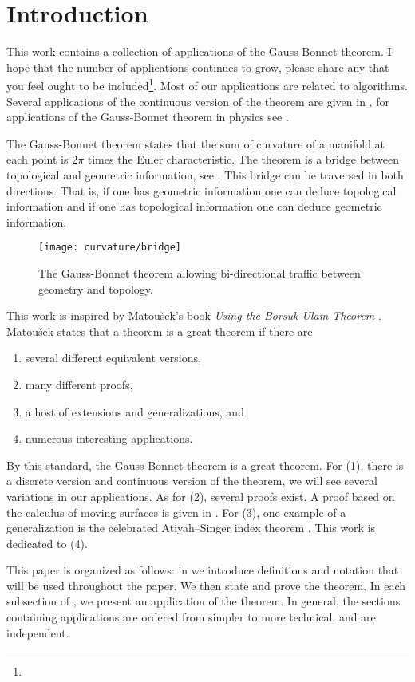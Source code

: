 \section{Introduction}
\label{sec:intro}

This work contains a collection of applications of the 
Gauss-Bonnet theorem.
I hope that the number of applications continues to grow,
please share any that you feel
ought to be included\footnote{}.
Most of our applications are related to algorithms. 
Several applications of the continuous version of the theorem
are given in \cite{doc76,pressley_elementary_2010}, for applications of the Gauss-Bonnet 
theorem in physics see \cite{tirado-physics-apps,gibbons_applications_2008}.

The Gauss-Bonnet theorem states that the sum of curvature
of a manifold at each point is $2\pi$ times the Euler characteristic.
The theorem is a bridge between topological
and geometric information, see . 
This bridge can be traversed in both directions.
That is, if one has geometric information one can deduce topological information and
if one has topological information one can deduce geometric information.


\begin{figure}[htb]
\centering
\texttt{[image: curvature/bridge]}
\caption{The Gauss-Bonnet theorem allowing bi-directional traffic
between geometry and topology.}
\label{fig:bridge}
\end{figure}

This work is inspired by Matou\v{s}ek's book \emph{Using the Borsuk-Ulam Theorem}
\cite{jm08}.
Matou\v{s}ek states that a theorem is a great theorem if there are
\begin{enumerate}[(1)]
\item several different equivalent versions,
\item many different proofs,
\item a host of extensions and generalizations, and
\item numerous interesting applications.
\end{enumerate}

By this standard, the Gauss-Bonnet theorem is a great theorem.
For (1), there is a discrete version and continuous version of the theorem,
we will see several variations in our applications.
As for (2), several proofs exist.
A proof based on the calculus of
moving surfaces is given in \cite{grinfeld_introduction_2013}.
For (3), one example of a generalization is the celebrated Atiyah–Singer index 
theorem \cite{atiyah_index_1963}.
This work is dedicated to (4).

This paper is organized as follows:
in  we introduce definitions and notation that will be used
throughout the paper. We then state and prove the theorem.
In each subsection of , we present an application of the theorem.
In general, the sections containing applications are ordered from simpler to more technical,
and are independent.


